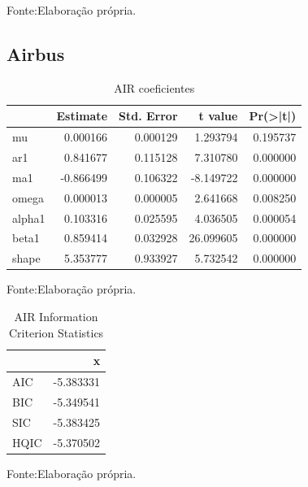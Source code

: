 \documentclass[
  12pt,
  a4paper,
  openany]{book}
\begin{document}
Fonte:Elaboração própria.

\justifying
\bigskip

\hypertarget{airbus}{%
\subsection{Airbus}\label{airbus}}

\begin{table}[!h]

\caption{\label{tab:unnamed-chunk-24}AIR coeficientes}
\centering
\begin{tabular}[t]{lrrrr}
\toprule
  &  Estimate &  Std. Error &  t value & Pr(>|t|)\\
\midrule
mu & 0.000166 & 0.000129 & 1.293794 & 0.195737\\
ar1 & 0.841677 & 0.115128 & 7.310780 & 0.000000\\
ma1 & -0.866499 & 0.106322 & -8.149722 & 0.000000\\
omega & 0.000013 & 0.000005 & 2.641668 & 0.008250\\
alpha1 & 0.103316 & 0.025595 & 4.036505 & 0.000054\\
\addlinespace
beta1 & 0.859414 & 0.032928 & 26.099605 & 0.000000\\
shape & 5.353777 & 0.933927 & 5.732542 & 0.000000\\
\bottomrule
\end{tabular}
\end{table}
\FloatBarrier
\centering

Fonte:Elaboração própria.

\justifying
\bigskip

\begin{table}[!h]

\caption{\label{tab:unnamed-chunk-25}AIR Information Criterion Statistics}
\centering
\begin{tabular}[t]{lr}
\toprule
  & x\\
\midrule
AIC & -5.383331\\
BIC & -5.349541\\
SIC & -5.383425\\
HQIC & -5.370502\\
\bottomrule
\end{tabular}
\end{table}
\FloatBarrier
\centering

Fonte:Elaboração própria.

\justifying
\bigskip
\end{document}
